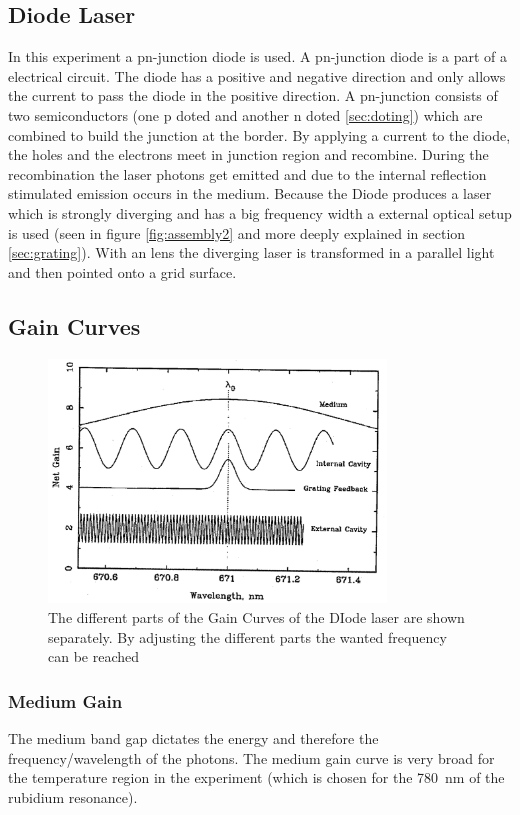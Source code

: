 \subsection{Diode Laser}
In this experiment a pn-junction diode is used.
A pn-junction diode is a part of a electrical circuit.
The diode has a positive and negative direction and only allows the current to pass the diode in the positive direction.
A pn-junction consists of two semiconductors (one p doted and another n doted \ref{sec:doting}) which are combined to build the junction at the border.
By applying a current to the diode, the holes and the electrons meet in junction region and recombine.
During the recombination the laser photons get emitted and due to the internal reflection stimulated emission occurs in the medium.
Because the Diode produces a laser which is strongly diverging and has a big frequency width  a external optical setup is used (seen in figure \ref{fig:assembly2} and more deeply explained in section \ref{sec:grating}).
With an lens the diverging laser is transformed in a parallel light and then pointed onto a grid surface.
\cite{laser_diode}

\subsection{Gain Curves}
\label{sec:gain}
\begin{figure}
    \center
    \includegraphics[width=0.8\textwidth]{bilder/Gain_curve.png}
    \caption{The different parts of the Gain Curves of the DIode laser are shown separately. By adjusting the different parts the wanted frequency can be reached \cite{anleitung}}
    \label{fig:gain}
\end{figure}
\subsubsection{Medium Gain}
The medium band gap dictates the energy and therefore the frequency/wavelength of the photons.
The medium gain curve is very broad for the temperature region in the experiment (which is chosen for the \SI{780}{\nano \metre} of the rubidium resonance).
